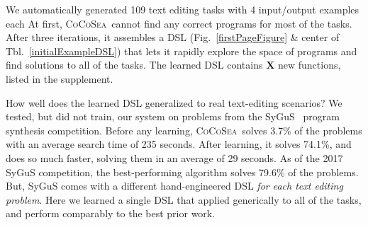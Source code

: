 \documentclass{article}
\newcommand{\system}{\textsc{CoCoSea}~}
\newcommand{\code}[1]{{\footnotesize\texttt{#1}}}
\begin{document}
We automatically generated 109 text editing tasks with 4 input/output examples each
At first, \system cannot find any correct programs for most of the tasks.
After three iterations, it assembles a DSL (Fig.~\ref{firstPageFigure} \& center of Tbl.~\ref{initialExampleDSL}) that lets it rapidly explore the space of programs and find solutions to
all of the tasks. The learned DSL contains \textbf{X} new functions, listed in the supplement.

How well does the  learned DSL generalized to real text-editing scenarios?
We tested, but did not train, our system on problems from the SyGuS~\cite{alur2016sygus} program synthesis competition. Before any learning,
\system solves 3.7\% of the problems with an average search time of 235 seconds.
After learning,
it solves 74.1\%, and does so much faster,
solving them in an average of 29 seconds.
As of the 2017 SyGuS competition,
the best-performing algorithm solves 79.6\% of the problems.
But, SyGuS comes with a
different hand-engineered DSL \emph{for each text editing problem}.
Here  we learned a single DSL
that applied generically to
all of the tasks,
and perform comparably to the best
prior work.


\end{document}
